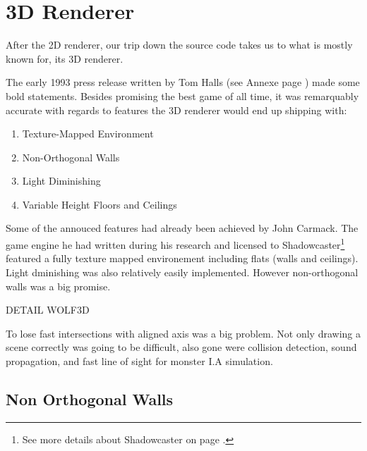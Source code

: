 \section{3D Renderer}
After the 2D renderer, our trip down the source code takes us to what \doom is mostly known for, its 3D renderer.\\
\par
{}

The early 1993 press release written by Tom Halls (see Annexe page \pageref{label_press_release}) made some bold statements. Besides promising the best game of all time, it was remarquably accurate with regards to features the 3D renderer would end up shipping with:\\
\par
\begin{enumerate}
\item Texture-Mapped Environment
\item Non-Orthogonal Walls
\item Light Diminishing
\item Variable Height Floors and Ceilings
\end{enumerate}
\par
Some of the annouced features had already been achieved by John Carmack. The game engine he had written during his research and licensed to Shadowcaster\footnote{See more details about Shadowcaster on page \pageref{label_shadowcaster}.} featured a fully texture mapped environement including flats (walls and ceilings). Light dminishing was also relatively easily implemented. However non-orthogonal walls was a big promise.\\
\par
DETAIL WOLF3D\\
\par
To lose fast intersections with aligned axis was a big problem. Not only drawing a scene correctly was going to be difficult, also gone were collision detection, sound propagation, and fast line of sight for monster I.A simulation.\\
\par
{}



\subsection{Non Orthogonal Walls}

